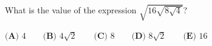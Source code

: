 What is the value of the expression $\sqrt{16\sqrt{8\sqrt{4}}}$?

$\textbf{(A) }4\qquad\textbf{(B) }4\sqrt{2}\qquad\textbf{(C) }8\qquad\textbf{(D) }8\sqrt{2}\qquad\textbf{(E) }16$
